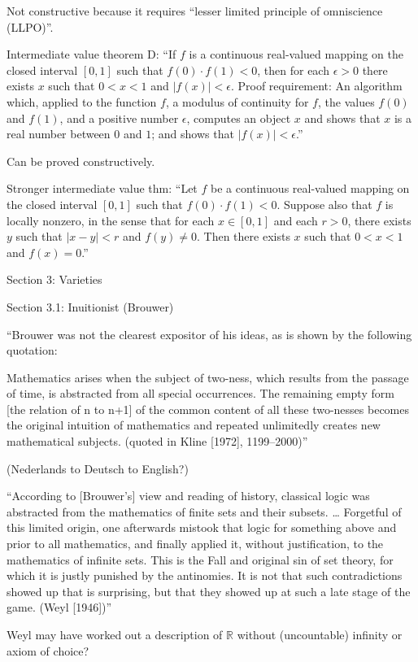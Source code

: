 Not constructive because it requires
``lesser limited principle of omniscience (LLPO)''.

Intermediate value theorem D:
``If $f$ is a continuous real-valued mapping 
on the closed interval $[0,1]$ 
such that $f(0)⋅f(1)<0$, 
then for each $\epsilon>0$ 
there exists $x$ such that $0<x<1$ and $|f(x)|<\epsilon$.
Proof requirement: 
An algorithm which, applied to the function $f$, 
a modulus of continuity for $f$, the values $f(0)$ and $f(1)$, 
and a positive number $\epsilon$,
computes an object $x$ 
and shows that $x$ is a real number between $0$ and $1$; and
shows that $|f(x)|<\epsilon$.''~\cite{sep:mathematics_constructive}

Can be proved constructively.

Stronger intermediate value thm:
``Let $f$ be a continuous real-valued mapping 
on the closed interval $[0,1]$ 
such that $f(0)⋅f(1)<0$. 
Suppose also that $f$ is locally nonzero, 
in the sense that for each $x \in [0,1]$
and each $r>0$, 
there exists $y$ such that $|x−y|<r$ and $f(y) \neq 0$. 
Then there exists $x$ such that $0<x<1$ and $f(x)=0$.''

Section 3: Varieties

Section 3.1: Inuitionist (Brouwer)

``Brouwer was not the clearest expositor of his ideas, 
as is shown by the following quotation:

Mathematics arises when the subject of two-ness, 
which results from the passage of time, 
is abstracted from all special occurrences. 
The remaining empty form [the relation of n to n+1] 
of the common content of all these two-nesses 
becomes the original intuition of mathematics 
and repeated unlimitedly creates new mathematical subjects. 
(quoted in Kline [1972], 1199–2000)''

(Nederlands to Deutsch to English?)

``According to [Brouwer’s] view and reading of history, 
classical logic was abstracted 
from the mathematics of finite sets and their subsets. \ldots 
Forgetful of this limited origin, 
one afterwards mistook that logic 
for something above and prior to all mathematics, 
and finally applied it, without justification, 
to the mathematics of infinite sets. 
This is the Fall and original sin of set theory, 
for which it is justly punished by the antinomies. 
It is not that such contradictions showed up that is surprising,
 but that they showed up at such a late stage of the game. 
 (Weyl [1946])''
 
Weyl may have worked out a description of
$\mathbb{R}$ without (uncountable) infinity or
axiom of choice?

